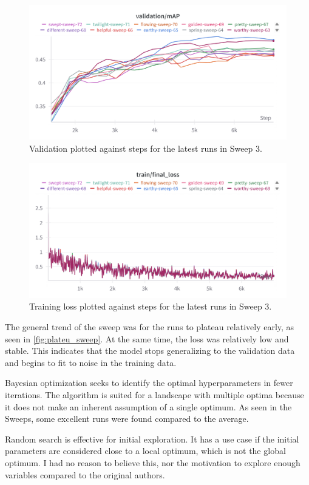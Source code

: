 \begin{figure}
    \centering
    \includegraphics[width=0.75\linewidth]{figures/plateu_sweep.png}
    \caption{Validation plotted against steps for the latest runs in Sweep 3. }
    \label{fig:plateu_sweep}
\end{figure}
\begin{figure}
    \centering
    \includegraphics[width=0.75\linewidth]{figures/plateu_loss.png}
    \caption{Training loss plotted against steps for the latest runs in Sweep 3.}
    \label{fig:plateu_loss}
\end{figure}

The general trend of the sweep was for the runs to plateau relatively early, as seen in \autoref{fig:plateu_sweep}. At the same time, the loss was relatively low and stable. This indicates that the model stops generalizing to the validation data and begins to fit to noise in the training data.


Bayesian optimization seeks to identify the optimal hyperparameters in fewer iterations. The algorithm is suited for a landscape with multiple optima because it does not make an inherent assumption of a single optimum. As seen in the Sweeps, some excellent runs were found compared to the average. 

Random search is effective for initial exploration. It has a use case if the initial parameters are considered close to a local optimum, which is not the global optimum. I had no reason to believe this, nor the motivation to explore enough variables compared to the original authors\cite{li_videomamba_2024}.

